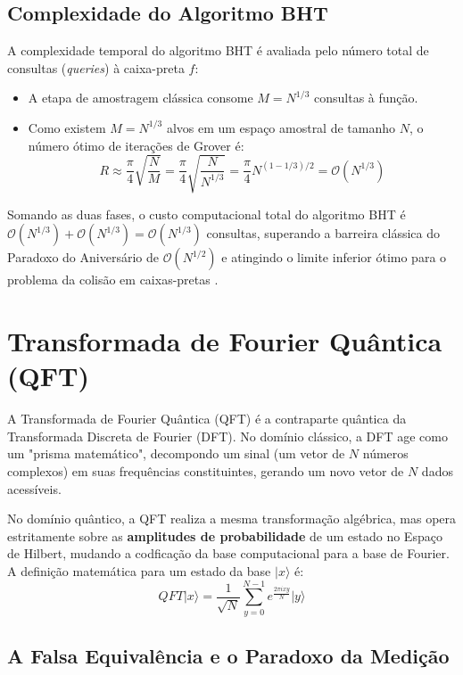 \documentclass[12pt, a4paper]{article}
\newcommand{\ket}[1]{\lvert #1 \rangle}
\begin{document}
\subsection{Complexidade do Algoritmo BHT}

A complexidade temporal do algoritmo BHT é avaliada pelo número total de consultas (\textit{queries}) à caixa-preta $f$:
\begin{itemize}
    \item A etapa de amostragem clássica consome $M = N^{1/3}$ consultas à função.
    \item Como existem $M = N^{1/3}$ alvos em um espaço amostral de tamanho $N$, o número ótimo de iterações de Grover é:
    \begin{equation}
        R \approx \frac{\pi}{4}\sqrt{\frac{N}{M}} = \frac{\pi}{4}\sqrt{\frac{N}{N^{1/3}}} = \frac{\pi}{4} N^{(1 - 1/3)/2} = \mathcal{O}(N^{1/3})
    \end{equation}
\end{itemize}

Somando as duas fases, o custo computacional total do algoritmo BHT é $\mathcal{O}(N^{1/3}) + \mathcal{O}(N^{1/3}) = \mathcal{O}(N^{1/3})$ consultas, superando a barreira clássica do Paradoxo do Aniversário de $\mathcal{O}(N^{1/2})$ e atingindo o limite inferior ótimo para o problema da colisão em caixas-pretas \cite{nielsen2010}.

\section{Transformada de Fourier Quântica (QFT)}

A Transformada de Fourier Quântica (QFT) é a contraparte quântica da Transformada Discreta de Fourier (DFT). No domínio clássico, a DFT age como um "prisma matemático", decompondo um sinal (um vetor de $N$ números complexos) em suas frequências constituintes, gerando um novo vetor de $N$ dados acessíveis.

No domínio quântico, a QFT realiza a mesma transformação algébrica, mas opera estritamente sobre as \textbf{amplitudes de probabilidade} de um estado no Espaço de Hilbert, mudando a codficação da base computacional para a base de Fourier. A definição matemática para um estado da base $\ket{x}$ é:
\begin{equation}
    QFT\ket{x} = \frac{1}{\sqrt{N}}\sum_{y=0}^{N-1} e^{\frac{2\pi i x y}{N}}\ket{y}
\end{equation}

\subsection{A Falsa Equivalência e o Paradoxo da Medição}
\end{document}
